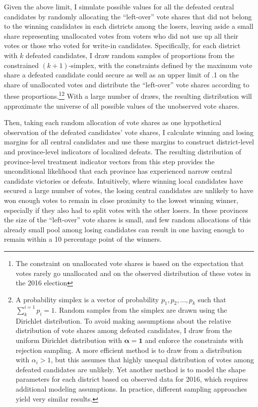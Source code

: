 \documentclass[12pt]{article}
\newcommand\fnote[1]{\footnote{\baselineskip=2\normalbaselineskip#1}}
\newcommand{\1}{\mathbbm{1}}
\begin{document}
Given the above limit, I simulate possible values for all the defeated central candidates by randomly allocating the ``left-over'' vote shares that did not belong to the winning candidates in each districts among the losers, leaving aside a small share representing unallocated votes from voters who did not use up all their votes or those who voted for write-in candidates. Specifically, for each district with $k$ defeated candidates, I draw random samples of proportions from the constrained $(k+1)$-simplex, with the constraints defined by the maximum vote share a defeated candidate could secure as well as an upper limit of .1 on the share of unallocated votes and distribute the ``left-over'' vote shares according to these proportions.\fnote{The constraint on unallocated vote shares is based on the expectation that votes rarely go unallocated and on the observed distribution of these votes in the 2016 election}\fnote{A probability simplex is a vector of probability $p_1, p_2, \dots, p_k$ such that $\sum_{k}^{i=1}p_i = 1$. Random samples from the simplex are drawn using the Dirichlet distribution. To avoid making assumptions about the relative distribution of vote shares among defeated candidates, I draw from the uniform Dirichlet distribution with $\mathbf{\alpha} = \mathbf{1}$ and enforce the constraints with rejection sampling. A more efficient method is to draw from a distribution with $\alpha_i > 1$, but this assumes that highly unequal distribution of votes among defeated candidates are unlikely. Yet another method is to model the shape parameters for each district based on observed data for 2016, which requires additional modeling assumptions. In practice, different sampling approaches yield very similar results.} With a large number of draws, the resulting distribution will approximate the universe of all possible values of the unobserved vote shares.

Then, taking each random allocation of vote shares as one hypothetical observation of the defeated candidates' vote shares, I calculate winning and losing margins for all central candidates and use these margins to construct district-level and province-level indicators of localized defeats. The resulting distribution of province-level treatment indicator vectors from this step provides the unconditional likelihood that each province has experienced narrow central candidate victories or defeats. Intuitively, where winning local candidates have secured a large number of votes, the losing central candidates are unlikely to have won enough votes to remain in close proximity to the lowest winning winner, especially if they also had to split votes with the other losers. In these provinces the size of the ``left-over'' vote shares is small, and few random allocations of this already small pool among losing candidates can result in one having enough to remain within a 10 percentage point of the winners.
\end{document}
